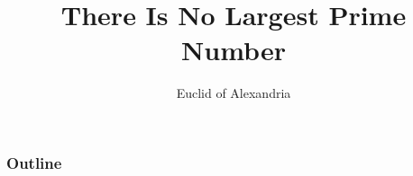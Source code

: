 \documentclass{beamer}
\title{There Is No Largest Prime Number}
\author{Euclid of Alexandria}
\begin{document}
\begin{frame}
\titlepage
\end{frame}
\begin{frame}
\frametitle{Outline}
 \tableofcontents
\end{frame}
\end{document}
